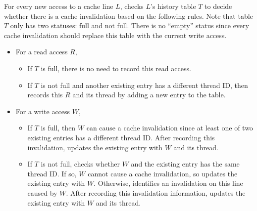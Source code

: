 \begin{comment}
\begin{table}
\centering
  \begin{tabular}{ l | r }
    \hline
    {Thread ID} & {Type of Access} \\ \hline
    \hline
     &   \\ \hline
     &   \\ \hline
  \end{tabular}
  \caption{Two-entries-cache-history table for every cache line. \label{table:cachehistory}}
\end{table} 
\end{comment}

For every new access to a cache line $L$, \Predator{} checks $L$'s history table $T$ to decide whether there is a cache invalidation based on the following rules.  Note that table $T$ only has two statuses: full and not full.  There is no ``empty'' status since every cache invalidation should replace this table with the current write access.

\begin{itemize}
\item
  For a read access $R$, 
  \begin{itemize}
    \item
      If $T$ is full, there is no need to record this read access.
    \item
      If $T$ is not full and another existing entry has a different thread
      ID, then \Predator{} records this $R$ and its thread by adding a new entry to the table. 
  \end{itemize}
\item
  For a write access $W$, 
  \begin{itemize}
    \item
      If $T$ is full, then $W$ can cause a cache invalidation since at least one of two existing entries has a different thread ID.
      After recording this invalidation, \Predator{} updates the
      existing entry with $W$ and its thread.
    \item
      If $T$ is not full,
      \Predator{} checks whether $W$ and the existing entry has the same thread ID. If
      so, $W$ cannot cause a cache invalidation, so \Predator{} updates the existing
      entry with $W$. Otherwise, \Predator{} identifies an invalidation on this line caused by $W$. 
      After recording this invalidation information, \Predator{} updates the
      existing entry with $W$ and its thread.
  \end{itemize}
\end{itemize}

